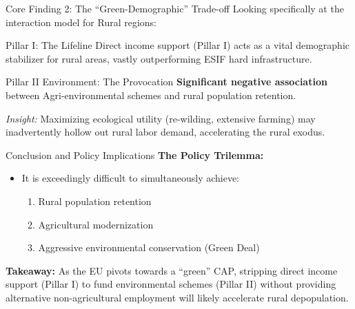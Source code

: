 \documentclass[aspectratio=169]{beamer}
\begin{document}
\begin{frame}{Core Finding 2: The ``Green-Demographic'' Trade-off}
    Looking specifically at the interaction model for Rural regions:
    \vspace{0.3cm}
    \begin{block}{Pillar I: The Lifeline}
        Direct income support (Pillar I) acts as a vital demographic stabilizer for rural areas, vastly outperforming ESIF hard infrastructure.
    \end{block}
    \vspace{0.2cm}\pause
    \begin{block}{Pillar II Environment: The Provocation}
        \textbf{Significant negative association} between Agri-environmental schemes and rural population retention. 
    \end{block}
    \vspace{0.2cm}
    \textit{Insight:} Maximizing ecological utility (re-wilding, extensive farming) may inadvertently hollow out rural labor demand, accelerating the rural exodus.
\end{frame}

\begin{frame}{Conclusion and Policy Implications}
    \textbf{The Policy Trilemma:}
    \begin{itemize}
        \item It is exceedingly difficult to simultaneously achieve:
        \begin{enumerate}
            \item Rural population retention
            \item Agricultural modernization
            \item Aggressive environmental conservation (Green Deal)
        \end{enumerate}
    \end{itemize}
    \vspace{0.5cm}
    \textbf{Takeaway:}
    As the EU pivots towards a ``green'' CAP, stripping direct income support (Pillar I) to fund environmental schemes (Pillar II) without providing alternative non-agricultural employment will likely accelerate rural depopulation.
\end{frame}
\end{document}
